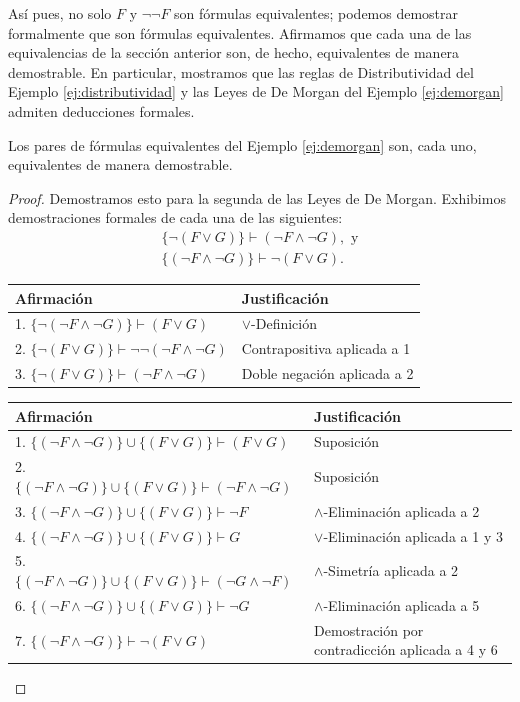 \message{ !name(main.tex)}\documentclass[12pt,a4paper]{book}
\makeatletter
\newenvironment{derivacion}{%
  \begingroup
  \renewcommand{\arraystretch}{1.35}
  \begin{center}
  \begin{tabular}{@{}l l@{}}
    \textbf{Afirmación} & \textbf{Justificación}\\
    \hline
}{%
  \end{tabular}
  \end{center}
  \endgroup
}
\makeatother
\begin{document}
    Así pues, no solo $F$ y $\neg\neg F$ son fórmulas equivalentes; podemos demostrar formalmente que son fórmulas
    equivalentes. Afirmamos que cada una de las equivalencias de la sección anterior son, de hecho, equivalentes de manera
    demostrable. En particular, mostramos que las reglas de Distributividad del Ejemplo \ref{ej:distributividad} y las Leyes de
    De Morgan del Ejemplo \ref{ej:demorgan} admiten deducciones formales.

    \begin{proposicion}\label{prop:demorgan-demostrable}
        Los pares de fórmulas equivalentes del Ejemplo \ref{ej:demorgan} son, cada uno, equivalentes de manera demostrable.
    \end{proposicion}
    \begin{proof}
        Demostramos esto para la segunda de las Leyes de De Morgan. Exhibimos demostraciones formales de cada una de las
        siguientes:
        \begin{gather*}
            \{\neg(F\vee G)\}\vdash(\neg F\wedge\neg G),\text{ y}\\
            \{(\neg F\wedge\neg G)\}\vdash\neg(F\vee G).
        \end{gather*}

        \begin{derivacion}
            1. $\{\neg(\neg F\wedge\neg G)\}\vdash(F\vee G)$ & $\vee$-Definición\\
            2. $\{\neg(F\vee G)\}\vdash\neg\neg(\neg F\wedge\neg G)$ & Contrapositiva aplicada a 1\\
            3. $\{\neg(F\vee G)\}\vdash(\neg F\wedge\neg G)$ & Doble negación aplicada a 2\\
        \end{derivacion}

        \vspace{0.3cm}

        \begin{derivacion}
            1. $\{(\neg F\wedge\neg G)\}\cup\{(F\vee G)\}\vdash(F\vee G)$ & Suposición\\
            2. $\{(\neg F\wedge\neg G)\}\cup\{(F\vee G)\}\vdash(\neg F\wedge\neg G)$ & Suposición\\
            3. $\{(\neg F\wedge\neg G)\}\cup\{(F\vee G)\}\vdash\neg F$ & $\wedge$-Eliminación aplicada a 2\\
            4. $\{(\neg F\wedge\neg G)\}\cup\{(F\vee G)\}\vdash G$ & $\vee$-Eliminación aplicada a 1 y 3\\
            5. $\{(\neg F\wedge\neg G)\}\cup\{(F\vee G)\}\vdash(\neg G\wedge\neg F)$ & $\wedge$-Simetría aplicada a 2\\
            6. $\{(\neg F\wedge\neg G)\}\cup\{(F\vee G)\}\vdash\neg G$ & $\wedge$-Eliminación aplicada a 5\\
            7. $\{(\neg F\wedge\neg G)\}\vdash\neg(F\vee G)$ & Demostración por contradicción aplicada a 4 y 6\\
        \end{derivacion}


\end{proof}
\end{document}
